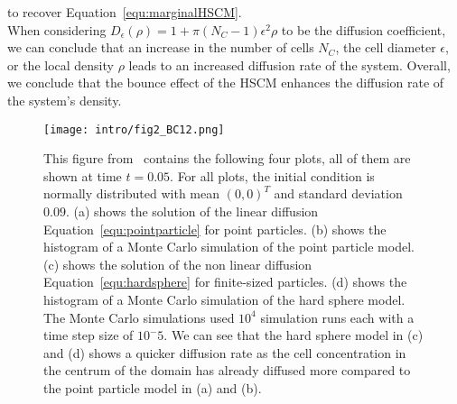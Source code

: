 to recover Equation~\ref{equ:marginalHSCM}. \\ 
When considering \( D_\epsilon(\rho) = 1 + \pi(N_{C}-1)\epsilon^2 \rho \) to be the diffusion coefficient, we can conclude that an increase in the number of cells \( N_{C} \), the cell diameter \( \epsilon \), or the local density \( \rho \) leads to an increased diffusion rate of the system.
Overall, we conclude that the bounce effect of the HSCM enhances the diffusion rate of the system's density.

\begin{figure}[h!]
	\centering
    \texttt{[image: intro/fig2\_BC12.png]}
    \caption{
    This figure from~\cite{Bruna2012} contains the following four plots, all of them are shown at time \( t=0.05 \). 
	For all plots, the initial condition is normally distributed with mean $(0,0)^T$ and standard deviation $0.09$. 
    (a) shows the solution of the linear diffusion Equation~\eqref{equ:pointparticle} for point particles. 
    (b) shows the histogram of a Monte Carlo simulation of the point particle model. 
    (c) shows the solution of the non linear diffusion Equation~\eqref{equ:hardsphere} for finite-sized particles. 
    (d) shows the histogram of a Monte Carlo simulation of the hard sphere model. 
    The Monte Carlo simulations used $10^4$ simulation runs each with a time step size of $10^-5$.
	We can see that the hard sphere model in (c) and (d) shows a quicker diffusion rate as the cell concentration in the centrum of the domain has already diffused more compared to the point particle model in (a) and (b). 
    }
    \label{fig:fig2BC12}
\end{figure}

